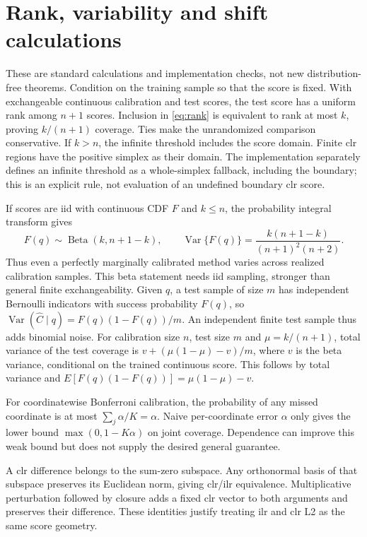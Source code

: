 \section{Rank, variability and shift calculations}
\label{app:theory}
These are standard calculations and implementation checks, not new distribution-free theorems. Condition on the training sample so that the score is fixed. With exchangeable continuous calibration and test scores, the test score has a uniform rank among $n+1$ scores. Inclusion in \eqref{eq:rank} is equivalent to rank at most $k$, proving $k/(n+1)$ coverage. Ties make the unrandomized comparison conservative. If $k>n$, the infinite threshold includes the score domain. Finite clr regions have the positive simplex as their domain. The implementation separately defines an infinite threshold as a whole-simplex fallback, including the boundary; this is an explicit rule, not evaluation of an undefined boundary clr score.

If scores are iid with continuous CDF $F$ and $k\le n$, the probability integral transform gives
\begin{equation}
 F(q)\sim\operatorname{Beta}(k,n+1-k),\qquad
 \operatorname{Var}\{F(q)\}=\frac{k(n+1-k)}{(n+1)^2(n+2)}.
\end{equation}
Thus even a perfectly marginally calibrated method varies across realized calibration samples. This beta statement needs iid sampling, stronger than general finite exchangeability. Given $q$, a test sample of size $m$ has independent Bernoulli indicators with success probability $F(q)$, so $\operatorname{Var}(\hat C\mid q)=F(q)(1-F(q))/m$. An independent finite test sample thus adds binomial noise. For calibration size $n$, test size $m$ and $\mu=k/(n+1)$, total variance of the test coverage is $v+(\mu(1-\mu)-v)/m$, where $v$ is the beta variance, conditional on the trained continuous score. This follows by total variance and $E[F(q)(1-F(q))]=\mu(1-\mu)-v$.

For coordinatewise Bonferroni calibration, the probability of any missed coordinate is at most $\sum_j\alpha/K=\alpha$. Naive per-coordinate error $\alpha$ only gives the lower bound $\max(0,1-K\alpha)$ on joint coverage. Dependence can improve this weak bound but does not supply the desired general guarantee.

A clr difference belongs to the sum-zero subspace. Any orthonormal basis of that subspace preserves its Euclidean norm, giving clr/ilr equivalence. Multiplicative perturbation followed by closure adds a fixed clr vector to both arguments and preserves their difference. These identities justify treating ilr and clr L2 as the same score geometry.

